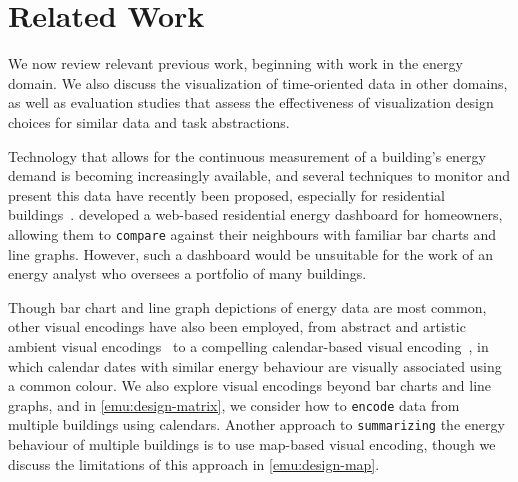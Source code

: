 
\section{Related Work}
\label{emu:related-work}


We now review relevant previous work, beginning with work in the energy domain. 
We also discuss the visualization of time-oriented data in other domains, as well as evaluation studies that assess the effectiveness of visualization design choices for similar data and task abstractions.

 Technology that allows for the continuous measurement of a building's energy demand is becoming increasingly available, and several techniques to monitor and present this data have recently been proposed, especially for residential buildings~\cite{Ellegard2011,Erickson2013,Goodwin2013,Rodgers2011}.
\citet{Erickson2013} developed a web-based residential energy dashboard for homeowners, allowing them to {\tt compare} against their neighbours with familiar bar charts and line graphs.
However, such a dashboard would be unsuitable for the work of an energy analyst who oversees a portfolio of many buildings.

Though bar chart and line graph depictions of energy data are most common, other visual encodings have also been employed, from abstract and artistic ambient visual encodings~\cite{Rodgers2011} to a compelling calendar-based visual encoding~\cite{VanWijk1999}, in which calendar dates with similar energy behaviour are visually associated using a common colour.
We also explore visual encodings beyond bar charts and line graphs, and in \autoref{emu:design-matrix}, we consider how to {\tt encode} data from multiple buildings using calendars.
Another approach to {\tt summarizing} the energy behaviour of multiple buildings is to use map-based visual encoding, though we discuss the limitations of this approach in \autoref{emu:design-map}. 

